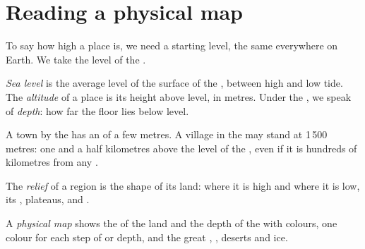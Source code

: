 \section{Reading a physical map}

To say how high a place is, we need a starting level, the same everywhere
on Earth. We take the level of the .

\begin{definition}\label{def:g4:world-physical-map:altitude}
\emph{Sea level} is the average level of the surface of
the , between high and low tide. The \emph{altitude} of
a place is its height above  level, in metres. Under the , we speak
of \emph{depth}: how far the  floor lies below  level.
\end{definition}

A town by the  has an  of a few metres. A village in the
 may stand at 1\,500 metres: one and a half kilometres above the
level of the , even if it is hundreds of kilometres from any .

\begin{definition}[Relief]\label{def:g4:world-physical-map:relief}
The \emph{relief} of a region is the shape of its land: where
it is high and where it is low, its , plateaus,  and
.
\end{definition}

\begin{definition}\label{def:g4:world-physical-map:physical-map}
A \emph{physical map} shows the  of the land and
the depth of the  with colours, one colour for each step of  or
depth, and the great , , deserts and ice.
\end{definition}


